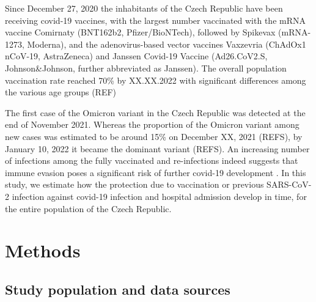 \documentclass[preprint,12pt,authoryear]{elsarticle}
\begin{document}
Since December 27, 2020 the inhabitants of the Czech Republic have been receiving covid-19 vaccines, with the largest number vaccinated with the mRNA vaccine Comirnaty (BNT162b2, Pfizer/BioNTech), followed by Spikevax (mRNA-1273, Moderna), and the adenovirus-based vector vaccines Vaxzevria (ChAdOx1 nCoV-19, AstraZeneca) and Janssen Covid-19 Vaccine (Ad26.CoV2.S, Johnson\&Johnson, further abbreviated as Janssen). The overall population vaccination rate reached 70\% by XX.XX.2022 with significant differences among the various age groups (REF) %

The first case of the Omicron variant in the Czech Republic was detected at the end of November 2021. Whereas the proportion of the Omicron variant among new cases was estimated to be around 15\% on December XX, 2021 (REFS), by January 10, 2022 it became the dominant variant (REFS). An increasing number of infections among the fully vaccinated and re-infections indeed suggests that immune evasion poses a significant risk of further covid-19 development \citep{mzcr}. In this study, we estimate how the protection due to vaccination or previous SARS-CoV-2 infection against covid-19 infection and hospital admission develop in time, for the entire population of the Czech Republic.

\section{Methods}
\label{sec2}

\subsection{Study population and data sources}
\end{document}
